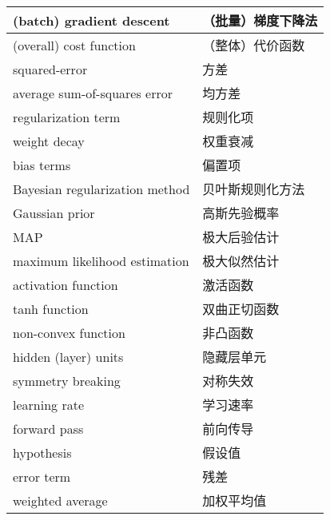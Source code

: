\begin{longtable}[h]{m{}m{}}
(batch) gradient descent & （批量）梯度下降法 \\
  \midrule

(overall) cost function & （整体）代价函数 \\
  \midrule

squared-error & 方差 \\
  \midrule

average sum-of-squares error & 均方差 \\
  \midrule

regularization term & 规则化项 \\
  \midrule

weight decay & 权重衰减 \\
  \midrule

bias terms & 偏置项 \\
  \midrule

Bayesian regularization method & 贝叶斯规则化方法 \\
  \midrule

Gaussian prior & 高斯先验概率 \\
  \midrule

MAP & 极大后验估计 \\
  \midrule

maximum likelihood estimation & 极大似然估计 \\
  \midrule

activation function & 激活函数 \\
  \midrule

tanh function & 双曲正切函数 \\
  \midrule

non-convex function & 非凸函数 \\
  \midrule

hidden (layer) units & 隐藏层单元 \\
  \midrule

symmetry breaking & 对称失效 \\
  \midrule

learning rate & 学习速率 \\
  \midrule

forward pass & 前向传导\\
  \midrule

hypothesis & 假设值 \\
  \midrule

error term & 残差 \\
  \midrule

weighted average & 加权平均值 \\
  \midrule


\end{longtable}
